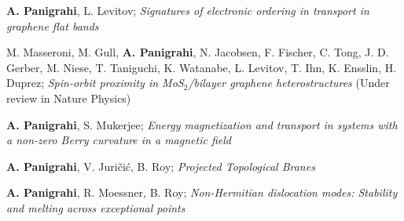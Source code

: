 

\begin{cventries}

  \cventry
    {} %
    {} %
    {} %
    {} %
    {
	  \begin{cvitems} %
	  	\item{\textbf{A. Panigrahi}, L. Levitov; \textit{Signatures of electronic ordering in transport in graphene flat bands} }
	  	\item{M. Masseroni, M. Gull, \textbf{A. Panigrahi}, N. Jacobsen, F. Fischer, C. Tong, J. D. Gerber, M. Niese, T. Taniguchi, K. Watanabe, L. Levitov, T. Ihn, K. Ensslin, H. Duprez; \textit{Spin-orbit proximity in MoS$_2$/bilayer graphene heterostructures}
	  		 (Under review in Nature Physics)}
	  	\item{\textbf{A. Panigrahi}, S. Mukerjee; \textit{Energy magnetization and transport in systems with a non-zero Berry curvature in a magnetic field}
	  		}
	  	\item{\textbf{A. Panigrahi}, V. Juri\v{c}i\'c, B. Roy; \textit{Projected Topological Branes}}
      	\item{\textbf{A. Panigrahi}, R. Moessner, B. Roy; \textit{Non-Hermitian dislocation modes: Stability and melting across exceptional points} }
      \end{cvitems}
    }


\end{cventries}
